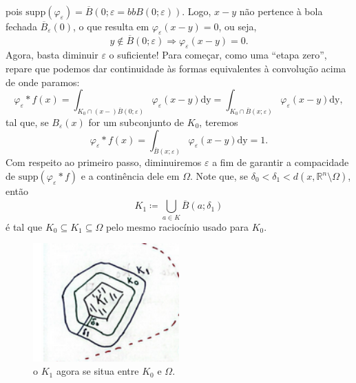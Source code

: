 \documentclass[../distribution_theory_notes.tex]{subfiles}
\begin{document}
\begin{proof*}
\begin{align*}
          \end{align*}
          pois \(\mathrm{supp}(\varphi_\varepsilon )=\overline{B}(0;\varepsilon =bbB(0; \varepsilon ))\). Logo, \(x-y\) não pertence à bola fechada \(\overline{B}_\varepsilon (0)\), o que resulta em \(\varphi_\varepsilon (x-y)=0\), ou seja, 
            \[
              y\not\in \overline{B}(0; \varepsilon )\Rightarrow \varphi_\varepsilon (x-y)=0.
            \]
            Agora, basta diminuir \(\varepsilon \) o suficiente! Para começar, como uma ``etapa zero'', repare que podemos dar continuidade às formas equivalentes à convolução acima de onde paramos: 
              \[
                \varphi_\varepsilon *f(x)=\int_{K_{0}\cap (x-)\overline{B}(0; \varepsilon )}^{}\varphi_\varepsilon (x-y) \mathrm{dy} = \int_{K_{0}\cap \overline{B}(x; \varepsilon )}^{} \varphi_\varepsilon (x-y)\mathrm{dy},
              \]
              tal que, se \(B_\varepsilon (x)\) for um subconjunto de \(K_{0}\), teremos 
                \[
                  \varphi_\varepsilon *f(x)=\int_{\overline{B}(x; \varepsilon )}^{}\varphi_\varepsilon (x-y) \mathrm{dy}=1.
                \]
                Com respeito ao primeiro passo, diminuiremos \(\varepsilon \) a fim de garantir a compacidade de \(\mathrm{supp}(\varphi_\varepsilon *f)\) e a continência dele em \(\Omega \). Note que, se \(\delta_0<\delta_1<d(x, \mathbb{R}^{n}\setminus{\Omega }) \), então 
                  \[
                    K_1\coloneqq \bigcup_{a\in K}^{}\overline{B}(a;\delta_1)
                  \]
                  é tal que \(K_{0}\subseteq K_1\subseteq \Omega \) pelo mesmo raciocínio usado para \(K_{0}\). 
                 \begin{figure}[H]
                 \begin{center}
                 \includegraphics[height=0.5\textheight, width=0.5\textwidth, keepaspectratio]{./Images/covering_k_09.png}
                 \end{center}
                 \caption{o \(K_1\) agora se situa entre \(K_0\) e \(\Omega\).}
                 \end{figure}


\end{proof*}
\end{document}
